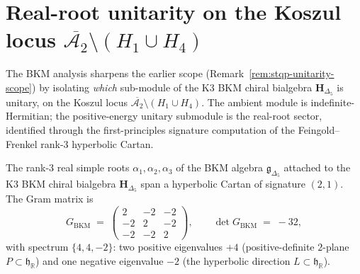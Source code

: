 \section{Real-root unitarity on the Koszul locus
$\overline{\mathcal A_2}\setminus(H_1\cup H_4)$}
\label{sec:stqp-unitarity}

The BKM analysis sharpens the earlier scope
(Remark~\ref{rem:stqp-unitarity-scope}) by isolating \emph{which}
sub-module of the K3 BKM chiral bialgebra $\mathbf H_{\Delta_5}$ is
unitary, on the Koszul locus
$\overline{\mathcal A_2}\setminus(H_1\cup H_4)$. The ambient module is
indefinite-Hermitian; the positive-energy unitary submodule is the
real-root sector, identified through the first-principles signature
computation of the Feingold--Frenkel rank-$3$ hyperbolic Cartan.

\begin{proposition}
\label{prop:stqp-signature}
The rank-$3$ real simple roots $\alpha_1, \alpha_2, \alpha_3$ of
the BKM algebra $\mathfrak g_{\Delta_5}$ attached to the K3 BKM
chiral bialgebra $\mathbf H_{\Delta_5}$ span a hyperbolic
Cartan of signature $(2,1)$. The Gram matrix is
\[
G_{\mathrm{BKM}} \;=\;
\begin{pmatrix}
2 & -2 & -2 \\
-2 & 2 & -2 \\
-2 & -2 & 2
\end{pmatrix},
\qquad
\det G_{\mathrm{BKM}} \;=\; -32,
\]
with spectrum $\{4, 4, -2\}$: two positive eigenvalues $+4$
(positive-definite $2$-plane $P \subset \mathfrak h_{\mathbb R}$)
and one negative eigenvalue $-2$ (the hyperbolic direction
$L \subset \mathfrak h_{\mathbb R}$).
\end{proposition}

